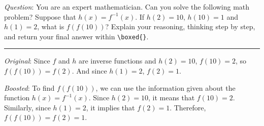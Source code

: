 \documentclass{article}
\begin{document}
\begin{center}
\begin{tcolorbox}[
    enhanced,
    width=\linewidth,
    fit to height=5cm,
    colback=green!4,
    colframe=green!50!black,
    boxrule=0.5pt,
    arc=2pt,
    title=\small{Math (Qwen2.5-3B)},
    left=2pt,
    right=2pt,
    top=1pt,
    bottom=0pt
]
{\small
\textit{Question}: You are an expert mathematician. Can you solve the following math problem? Suppose that $h(x)=f^{-1}(x)$. If $h(2)=10$, $h(10)=1$ and $h(1)=2$, what is $f(f(10))$? Explain your reasoning, thinking step by step, and return your final answer within \texttt{\textbackslash boxed\{\}}.

\vspace{0.1em}
\noindent\rule{\linewidth}{0.4pt}
\vspace{0.1em}

\textit{Original}: Since $f$ and $h$ are inverse functions and $h(2) = 10$, $f(10) = 2$, so $f(f(10)) = f(2)$.  And since $h(1) = 2$, $f(2) = \boxed{1}$.


\vspace{1em}

\textit{Boosted}: To find $f(f(10))$, we can use the information given about the function $h(x) = f^{-1}(x)$. Since $h(2) = 10$, it means that $f(10) = 2$. Similarly, since $h(1) = 2$, it implies that $f(2) = 1$. Therefore, $f(f(10)) = f(2) = \boxed{1}$.}
\end{tcolorbox}
\end{center}
\end{document}

